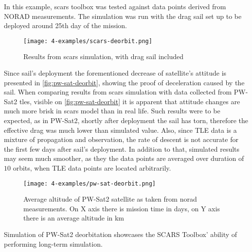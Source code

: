             In this example, \ac{scars} toolbox was tested against data points derived from NORAD measurements. The simulation was run with the drag sail set up to be deployed around 25th day of the mission.
                         
            \begin{figure}[H]
                \centering
                \texttt{[image: 4-examples/scars-deorbit.png]}
                \caption{Results from \ac{scars} simulation, with drag sail included}
                \label{fig:scars-deorbit}
            \end{figure}

            Since sail's deployment the forementioned decrease of satellite's attitude is presented in \autoref{fig:pw-sat-deorbit}, showing the proof of deceleration caused by the sail. When comparing results from \ac{scars} simulation with data collected from PW-Sat2 \ac{tle}s, visible on \autoref{fig:pw-sat-deorbit} it is apparent that attitude changes are much more brisk in \ac{scars} model than in real life. Such results were to be expected, as in PW-Sat2, shortly after deployment the sail has torn, therefore the effective drag was much lower than simulated value\cite{space24_pwsat}. Also, since TLE data is a mixture of propagation and observation, the rate of descent is not accurate for the first few days after sail's deployment. In addition to that, simulated results may seem much smoother, as they the data points are averaged over duration of $10$ orbits, when TLE data points are located arbitrarily.
            
            \begin{figure}[H]
                \centering
                \texttt{[image: 4-examples/pw-sat-deorbit.png]}
                \caption{Average altitude of PW-Sat2 satellite as taken from \ac{norad} measurements. On X axis there is mission time in days, on Y axis there is an average altitude in km\cite{pw_sat2_deorbit}}
                \label{fig:pw-sat-deorbit}
            \end{figure}

            Simulation of PW-Sat2 deorbitation showcases the SCARS Toolbox' ability of performing long-term simulation.
            


